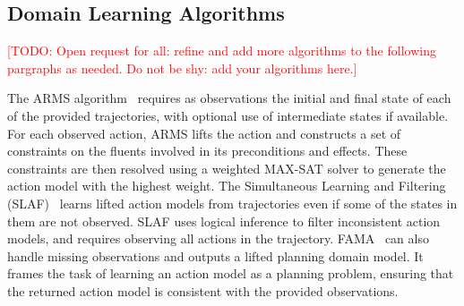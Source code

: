 \documentclass{article}
\theoremstyle{definition}
\theoremstyle{remark}
\newcommand{\todo}[1]{{\textcolor{red}{[TODO: #1]}}}
\begin{document}
\subsection{Domain Learning Algorithms}

\todo{Open request for all: refine and add more algorithms to the following pargraphs as needed. Do not be shy: add your algorithms here.}

The ARMS algorithm~\citep{yang2007learning} requires as observations the initial and final state of each of the provided trajectories, with optional use of intermediate states if available. For each observed action, ARMS lifts the action and constructs a set of constraints on the fluents involved in its preconditions and effects. These constraints are then resolved using a weighted MAX-SAT solver to generate the action model with the highest weight.
The Simultaneous Learning and Filtering (SLAF)~\citep{amir2008learning} learns lifted action models from trajectories even if some of the states in them are not observed. 
SLAF uses logical inference to filter inconsistent action models, and requires observing all actions in the trajectory.  
FAMA~\citep{aineto2019learning} can also handle missing observations and outputs a lifted planning domain model. 
It frames the task of learning an action model as a planning problem, ensuring that the returned action model is consistent with the provided observations.
\end{document}
